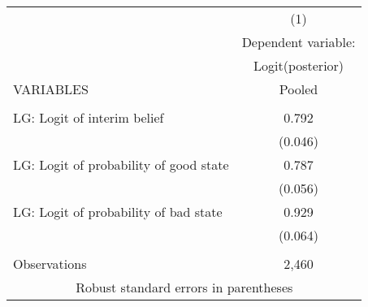 \documentclass[]{article}
\begin{document}
\begin{tabular}{lc} \hline
 & (1) \\
 & Dependent variable: \\
 & Logit(posterior) \\
VARIABLES & Pooled \\ \hline
 &  \\
LG: Logit of interim belief & 0.792 \\
 & (0.046) \\
LG: Logit of probability of good state & 0.787 \\
 & (0.056) \\
LG: Logit of probability of bad state & 0.929 \\
 & (0.064) \\
 &  \\
 Observations & 2,460 \\ \hline
\multicolumn{2}{c}{ Robust standard errors in parentheses} \\
\end{tabular}
\end{document}

